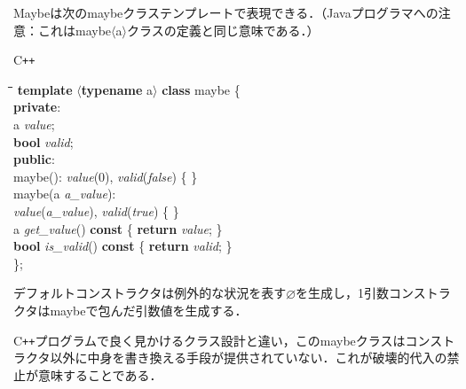 \documentclass[twocolumn]{jsbook}
\newcommand{\programminglanguage}[1]{\textsf{#1}}
\newcommand{\cxx}{\programminglanguage{C}\texttt{++}}
\newenvironment{cxxcode}{\begin{itembox}[r]{\cxx}}{\end{itembox}}
\newenvironment{pythontab}{\begin{tabbing}\hspace*{1em}\=\hspace*{1em}\=\hspace*{1em}\=\hspace*{1em}\=\kill}{\end{tabbing}}
\newcommand{\pthnClassname}[1]{\textrm{#1}}
\newcommand{\pthnId}[1]{\textit{#1}}
\newcommand{\pthnKeyword}[1]{\textbf{#1}}
\newcommand{\hsklNothing}{\varnothing}
\begin{document}
Maybeは次の\pthnClassname{maybe}クラステンプレートで表現できる．（Javaプログラマへの注意：これは\pthnClassname{maybe}$\langle$\pthnClassname{a}$\rangle$クラスの定義と同じ意味である．）
\begin{cxxcode}
\begin{pythontab}
\pthnKeyword{template} $\langle$\pthnKeyword{typename} \pthnClassname{a}$\rangle$ \pthnKeyword{class} \pthnClassname{maybe} \{\\
\pthnKeyword{private}:\\
\>\pthnClassname{a} \pthnId{value};\\
\>\pthnKeyword{bool} \pthnId{valid};\\
\pthnKeyword{public}:\\
\>\pthnClassname{maybe}(): \pthnId{value}($0$), \pthnId{valid}(\pthnId{false}) \{ \}\\
\>\pthnClassname{maybe}(\pthnClassname{a} \pthnId{a\_value}):\\
\>\>\pthnId{value}(\pthnId{a\_value}), \pthnId{valid}(\pthnId{true}) \{ \}\\
\>\pthnClassname{a} \pthnId{get\_value}() \pthnKeyword{const} \{ \pthnKeyword{return} \pthnId{value}; \}\\
\>\pthnKeyword{bool} \pthnId{is\_valid}() \pthnKeyword{const} \{ \pthnKeyword{return} \pthnId{valid}; \}\\
\};
\end{pythontab}
\end{cxxcode}
デフォルトコンストラクタは例外的な状況を表す$\hsklNothing$を生成し，1引数コンストラクタは\pthnClassname{maybe}で包んだ引数値を生成する．

\cxx プログラムで良く見かけるクラス設計と違い，この\pthnClassname{maybe}クラスはコンストラクタ以外に中身を書き換える手段が提供されていない．これが破壊的代入の禁止が意味することである．
\end{document}
